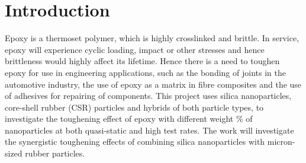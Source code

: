 \documentclass[numbers=noendperiod,chapterprefix=on]{icldt} %
\begin{document}



\section{Introduction}
Epoxy is a thermoset polymer, which is highly crosslinked and brittle. In service, epoxy will experience cyclic loading, impact or other stresses and hence brittleness would highly affect its lifetime. Hence there is a need to toughen epoxy for use in engineering applications, such as the bonding of joints in the automotive industry, the use of epoxy as a matrix in fibre composites and the use of adhesives for repairing of components. This project uses silica nanoparticles, core-shell rubber (CSR) particles and hybrids of both particle types, to investigate the toughening effect of epoxy with different weight \% of nanoparticles at both quasi-static and high test rates. The work will investigate the synergistic toughening effects of combining silica nanoparticles with micron-sized rubber particles.
 
\end{document}
